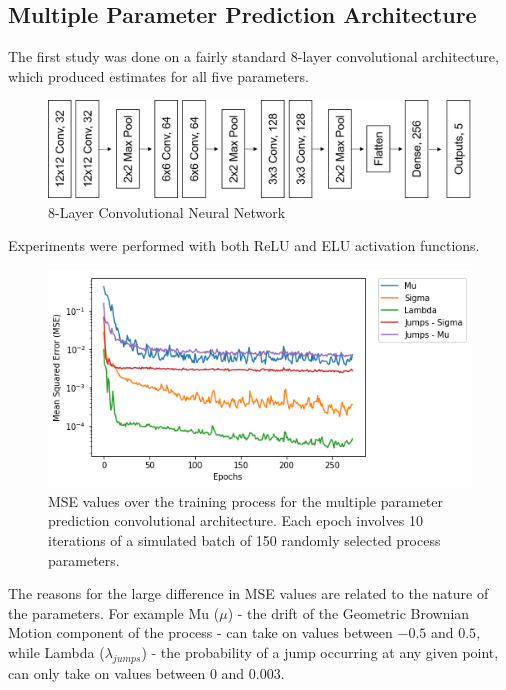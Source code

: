 \documentclass[11pt,oneside,openany,a4paper,english, report, goldenblock
]{usthesis}
\begin{document}
\subsection{Multiple Parameter Prediction Architecture}
\label{chap:ConvolutionalNeuralNetwork-section:MultipleParameterPredictionArchitecture}
The first study was done on a fairly standard 8-layer convolutional architecture, which produced estimates for all five parameters.

\begin{figure}[h]
	\centering
	\includegraphics[width=0.72\linewidth]{MultipleOutputCNN}
	\caption[Multiple Output Prediction CNN]{8-Layer Convolutional Neural Network}
	\label{fig:multipleoutputcnn}
\end{figure}

Experiments were performed with both ReLU and ELU activation functions. 

\begin{figure}[h]
	\centering
	\includegraphics[width=0.7\linewidth]{Results/Training/COVNET_MO_MSE}
	\caption[MSE values over the training process for the 8-Layer Convolutional Neural Network]{MSE values over the training process for the multiple parameter prediction convolutional architecture. Each epoch involves 10 iterations of a simulated batch of 150 randomly selected process parameters.}
	\label{fig:covnetmomse}
\end{figure}

The reasons for the large difference in MSE values are related to the nature of the parameters. For example Mu ($\mu$) - the drift of the Geometric Brownian Motion component of the process - can take on values between $-0.5$ and $0.5$, while Lambda ($\lambda_{jumps}$) - the probability of a jump occurring at any given point, can only take on values between $0$ and $0.003$.
\end{document}
